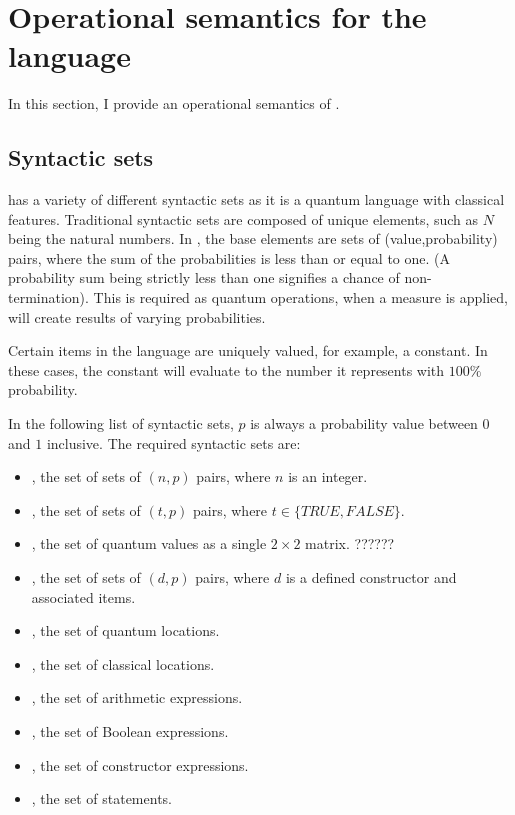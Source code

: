 \section{Operational semantics for the language \lqpl}
\label{sec:operationalsemanticslqpl}
In this section, I provide an operational semantics of \lqpl.
\subsection{Syntactic sets}\label{subsec:opsyntacticsets}
\lqpl{} has a variety of different syntactic sets as it is a quantum 
language with classical features. Traditional syntactic sets are composed
of unique elements, such as $N$ being the natural numbers. In \lqpl, the
base elements are sets of (value,probability) pairs, where the sum
of the probabilities is less than or equal to one. (A probability sum 
being strictly less than one signifies a chance of non-termination). 
This is required as
quantum operations, when a measure is applied, will create results of 
varying probabilities.

Certain items in the language are uniquely valued, for example, a constant.
In these cases, the constant will evaluate to the number it represents with
$100\%$ probability.

In the following list of syntactic sets, $p$ is always a probability
value between $0$ and $1$ inclusive. The required syntactic sets are:
\begin{itemize}
\item{} \n, the set of sets of $(n,p)$ pairs, where $n$ is an integer.
\item{} \T, the set of sets of $(t,p)$ pairs, 
where $t \in \{TRUE, FALSE\}$.
\item{} \Q, the set of quantum values as a single $2\times2$ matrix. ??????
\item{} \Data, the set of sets of $(d,p)$ pairs, where $d$ is a
defined constructor and associated items. 
\item{} \Qloc, the set of quantum locations.
\item{} \Cloc, the set of classical locations.
\item{} \Aexp, the set of arithmetic expressions.
\item{} \Bexp, the set of Boolean expressions.
\item{} \Cexp, the set of constructor expressions.
\item{} \Stm, the set of statements.
\end{itemize}

